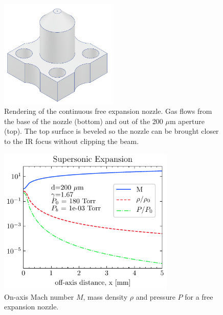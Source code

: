 \begin{figure}
	\centering
	\includegraphics[width=0.5\textwidth]{figures/chap3/gas_nozzle.png}
	\caption{Rendering of the continuous free expansion nozzle. Gas flows from the base of the nozzle (bottom) and out of the 200 $\mu$m aperture (top). The top surface is beveled so the nozzle can be brought closer to the IR focus without clipping the beam.}
	\label{fig:gas_nozzle}
\end{figure}

\begin{figure}
	\centering
	\includegraphics[width=0.75\textwidth]{figures/chap3/M_rho_P_vs_x.pdf}
	\caption{On-axis Mach number $M$, mass density $\rho$ and pressure $P$ for a free expansion nozzle.}
	\label{fig:M_rho_vs_x}
\end{figure}



